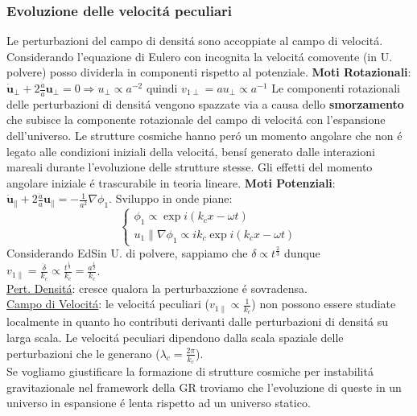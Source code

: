 \documentclass[12pt, a4paper]{article}
\begin{document}
\subsubsection{Evoluzione delle velocit\'{a} peculiari}
Le perturbazioni del campo di densit\'{a} sono accoppiate al campo di velocit\'{a}. Considerando l'equazione di Eulero con incognita la velocit\'{a} comovente (in U. polvere) posso dividerla in componenti rispetto al potenziale.
\textbf{Moti Rotazionali}: $\dot{\textbf{u}}_{\perp}+2\frac{\dot{a}}{a}\textbf{u}_{\perp}=0 \Rightarrow u _{\perp}\propto a^{-2}$ quindi $v_{1\perp}= a u _{\perp}\propto a^{-1}$ 
Le componenti rotazionali delle perturbazioni di densit\'{a} vengono spazzate via a causa dello \textbf{smorzamento} che subisce la componente rotazionale del campo di velocit\'{a} con l'espansione dell'universo. Le strutture cosmiche hanno per\'{o} un momento angolare che non \'{e} legato alle condizioni iniziali della velocit\'{a}, bens\'{i} generato dalle interazioni mareali durante l'evoluzione delle strutture stesse. Gli effetti del momento angolare iniziale \'{e} trascurabile in teoria lineare.
\textbf{Moti Potenziali}: $\dot{\textbf{u}}_{\parallel}+2\frac{\dot{a}}{a}\textbf{u}_{\parallel}=-\frac{1}{a^2}\nabla\phi_1$. Sviluppo in onde piane:
\begin{equation}
\begin{cases}
\phi_1 \propto \exp{i(k_cx-\omega t)}
\\
u_1 \parallel \nabla\phi_1 \propto i k_c \exp{i(k_cx-\omega t)}
\end{cases}
\end{equation}
Considerando EdSin U. di polvere, sappiamo che $\delta\propto t^{\frac{2}{3}}$ dunque $v_{1\parallel} =\frac{\dot{\delta}}{k_c} \propto \frac{t^{\frac{1}{3}}}{k_c}=\frac{a^{\frac{1}{2}}}{k_c}$.\\
\underline{Pert. Densit\'{a}}: cresce qualora la perturbaxzione \'{e} sovradensa.\\
\underline{Campo di Velocit\'{a}}: le velocit\'{a} peculiari ($v_{1\parallel}\propto \frac{1}{k_c}$) non possono essere studiate localmente in quanto ho contributi derivanti dalle perturbazioni di densit\'{a} su larga scala. Le velocit\'{a} peculiari dipendono dalla scala spaziale delle perturbazioni che le generano ($\lambda_c=\frac{2\pi}{k_c}$).\\ 
Se vogliamo giustificare la formazione di strutture cosmiche per instabilit\'{a} gravitazionale nel framework della GR troviamo che l'evoluzione di queste in un universo in espansione \'{e} lenta rispetto ad un universo statico.
\end{document}
